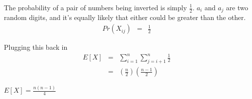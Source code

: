 \documentclass{article}
\begin{document}
The probability of a pair of numbers being inverted is simply $\frac{1}{2}$.
$a_i$ and $a_j$ are two random digits, and it's equally likely that either 
could be greater than the other.
\begin{eqnarray*}
Pr(X_{ij}) & = & \frac{1}{2}
\end{eqnarray*}

Plugging this back in
\begin{eqnarray*}
E[X] & = & \sum\limits_{i=1}^n \sum\limits_{j=i+1}^n \frac{1}{2}\\
     & = & \left(\frac{n}{2}\right)\left(\frac{n-1}{2}\right)
\end{eqnarray*}

\begin{center}
$\boxed{E[X] = \frac{n(n-1)}{4}}$
\end{center}
\end{document}
